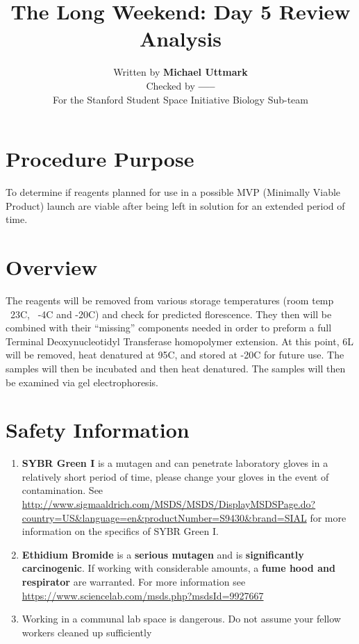 \documentclass[a4paper,xcolor=table]{article}
\title{The Long Weekend: Day 5 Review Analysis}
\author{Written by \textbf{Michael Uttmark}\\
		Checked by \textbf{-----}\\
        For the Stanford Student Space Initiative Biology Sub-team}
\newenvironment{safety}{%
\begin{tcolorbox}[width=\textwidth, colframe=safetyFrame, arc=1.5mm]
}%
{\end{tcolorbox}}
\newcommand{\tdt}{Terminal Deoxynucleotidyl Transferase}
\newcommand{\C}{\degree C}
\newcommand{\B}[1]{\textbf{#1}}
\newcommand{\uL}{\micro{}L}
\begin{document}
\maketitle

\section{Procedure Purpose}
To determine if reagents planned for use in a possible MVP (Minimally Viable Product) launch are viable after being left in solution for an extended period of time. 

\section{Overview}
The reagents will be removed from various storage temperatures (room temp ~23\C, ~-4\C\: and -20\C) and check for predicted florescence. They then will be combined with their “missing” components needed in order to preform a full \tdt{} homopolymer extension. At this point, 6\uL{} will be removed, heat denatured at 95\C, and stored at -20\C\: for future use. The samples will then be incubated and then heat denatured. The samples will then be examined via gel electrophoresis.\\

\section{Safety Information}
\begin{safety}
\begin{enumerate}
\item{\B{SYBR Green I} is a mutagen and can penetrate laboratory gloves in a relatively short period of time, please change your gloves in the event of contamination. See \url{http://www.sigmaaldrich.com/MSDS/MSDS/DisplayMSDSPage.do?country=US&language=en&productNumber=S9430&brand=SIAL} for more information on the specifics of SYBR Green I. 
}
\item{\B{Ethidium Bromide} is a \B{serious mutagen} and is \B{significantly carcinogenic}. If working with considerable amounts, a \B{fume hood and respirator} are warranted. For more information see \url{https://www.sciencelab.com/msds.php?msdsId=9927667}
}
\item{Working in a communal lab space is dangerous. Do not assume your fellow workers cleaned up sufficiently}
\end{enumerate}
\end{safety}
\end{document}
